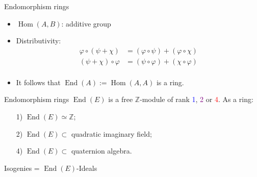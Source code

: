\documentclass[aspectratio=169]{beamer}
\newcommand{\End}{\operatorname{End}}
\newcommand{\Hom}{\operatorname{Hom}}
\begin{document}

\begin{frame}{Endomorphism rings}
  \large
  \begin{itemize}
    \setlength{\itemsep}{2em}
  \item $\Hom(A,B)$: additive group
  \item Distributivity:
    \begin{align*}
      φ∘(ψ+χ) &= (φ∘ψ)+(φ∘χ)\\[2em]
      (ψ+χ)∘φ &= (ψ∘φ)+(χ∘φ)\\
    \end{align*}
  \item It follows that \emph{$\End(A) := \Hom(A,A)$} is a ring.
  \end{itemize}  
\end{frame}


\begin{frame}{Endomorphism rings}
  \large $\End(E)$ is a free $ℤ$-module of rank \textcolor{blue}{1},
  \textcolor{purple}{2} or \textcolor{red}{4}. As a ring:

  \bigskip
  \begin{enumerate}
    \setlength{\itemsep}{1em}
  \item[\color{blue}1)] $\End(E) ≃ ℤ$;
  \item[\color{purple}2)] $\End(E) ⊂$ quadratic imaginary field;
  \item[\color{red}4)] $\End(E) ⊂$ quaternion algebra.
  \end{enumerate}
\end{frame}


\begin{frame}{Isogenies = $\End(E)$-Ideals}
  \large\centering
\end{frame}
\end{document}
